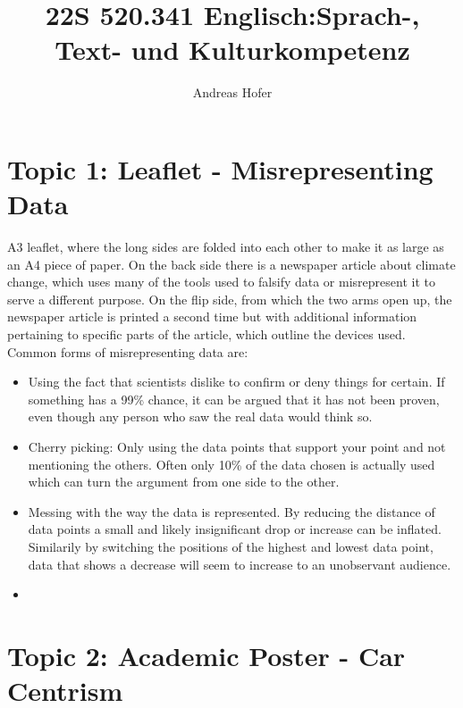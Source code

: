 \documentclass{article}
\title{\vspace{-3cm}22S 520.341 Englisch:Sprach-, Text- und Kulturkompetenz}
\author{Andreas Hofer}
\begin{document}
	\section*{Topic 1: Leaflet - Misrepresenting Data}
	A3 leaflet, where the long sides are folded into each other to make it as large as an A4 piece of paper. On the back side there is a newspaper article about climate change, which uses many of the tools used to falsify data or misrepresent it to serve a different purpose. On the flip side, from which the two arms open up, the newspaper article is printed a second time but with additional information pertaining to specific parts of the article, which outline the devices used. Common forms of misrepresenting data are:
	\begin{itemize}
		\item{Using the fact that scientists dislike to confirm or deny things for certain. If something has a 99\% chance, it can be argued that it has not been proven, even though any person who saw the real data would think so.}
		\item{Cherry picking: Only using the data points that support your point and not mentioning the others. Often only 10\% of the data chosen is actually used which can turn the argument from one side to the other.}
		\item{Messing with the way the data is represented. By reducing the distance of data points a small and likely insignificant drop or increase can be inflated. Similarily by switching the positions of the highest and lowest data point, data that shows a decrease will seem to increase to an unobservant audience.}
		\item{}
	\end{itemize}

	\section*{Topic 2: Academic Poster - Car Centrism}
	
\end{document}
